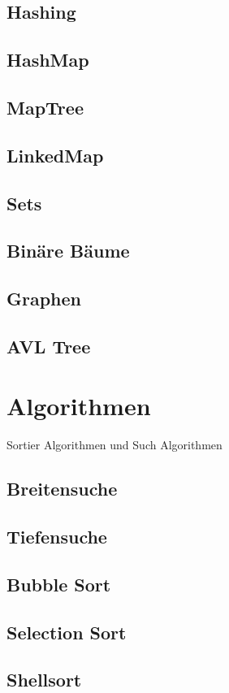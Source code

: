 \documentclass{book}
\begin{document}
\section{Hashing}
\section{HashMap}
\section{MapTree}
\section{LinkedMap}
\section{Sets}
\section{Binäre Bäume}
\section{Graphen}
\section{AVL Tree}

\chapter{Algorithmen}
Sortier Algorithmen und Such Algorithmen
\section{Breitensuche}
\section{Tiefensuche}
\section{Bubble Sort}
\section{Selection Sort}
\section{Shellsort}
\end{document}

